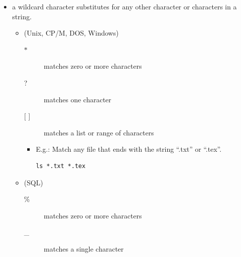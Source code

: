 \documentclass[a4paper,landscape,headrule,footrule,dvips]{foils}
\begin{document}
\begin{CJK}{UTF8}{min}
\MyLogo{}

\begin{itemize}
\item  a wildcard character  substitutes for any other character or characters in a string.
  \begin{itemize}
  \item {} (Unix, CP/M, DOS, Windows)
    \begin{description}
    \item[$*$] matches zero or more characters
    \item[?] matches one character
    \item[{[ ]}] matches a list or range of characters
    \end{description}
    \begin{itemize}
      \item E.g.:  Match any file that ends with the string ``.txt'' or ``.tex''.
\begin{verbatim}
ls *.txt *.tex
\end{verbatim}
     \end{itemize}
    \item {} (SQL)
    \begin{description}
    \item[\%]  matches zero or more characters
    \item[\_] matches a single character
    \end{description}
  \end{itemize}
\end{itemize}



\end{CJK}
\end{document}
